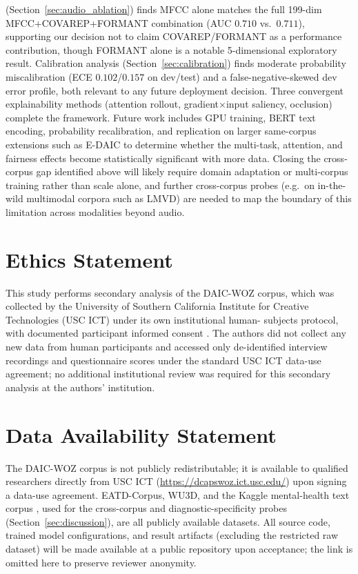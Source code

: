 \documentclass[journal]{IEEEtran}
\begin{document}
(Section~\ref{sec:audio_ablation}) finds MFCC alone matches the full
199-dim MFCC+COVAREP+FORMANT combination (AUC $0.710$ vs.\ $0.711$),
supporting our decision not to claim COVAREP/FORMANT as a performance
contribution, though FORMANT alone is a notable 5-dimensional
exploratory result. Calibration analysis
(Section~\ref{sec:calibration}) finds moderate probability
miscalibration (ECE $0.102$/$0.157$ on dev/test) and a
false-negative-skewed dev error profile, both relevant to any future
deployment decision. Three convergent explainability methods
(attention rollout, gradient$\times$input saliency, occlusion)
complete the framework. Future work includes GPU training, BERT text
encoding, probability recalibration, and replication on larger
same-corpus extensions such as E-DAIC to determine whether the
multi-task, attention, and fairness effects become statistically
significant with more data. Closing the cross-corpus gap identified
above will likely require domain adaptation or multi-corpus training
rather than scale alone, and further cross-corpus probes (e.g.\ on
in-the-wild multimodal corpora such as LMVD) are needed to map the
boundary of this limitation across modalities beyond audio.

\section*{Ethics Statement}
This study performs secondary analysis of the DAIC-WOZ corpus, which
was collected by the University of Southern California Institute for
Creative Technologies (USC ICT) under its own institutional human-
subjects protocol, with documented participant informed consent
\cite{gratch2014}. The authors did not collect any new data from human
participants and accessed only de-identified interview recordings and
questionnaire scores under the standard USC ICT data-use agreement;
no additional institutional review was required for this secondary
analysis at the authors' institution.

\section*{Data Availability Statement}
The DAIC-WOZ corpus is not publicly redistributable; it is available
to qualified researchers directly from USC ICT
(\url{https://dcapswoz.ict.usc.edu/}) upon signing a data-use
agreement. EATD-Corpus, WU3D, and the Kaggle mental-health text corpus
\cite{sarkar2022mentalhealth}, used for the cross-corpus and
diagnostic-specificity probes (Section~\ref{sec:discussion}), are all
publicly available datasets. All source code, trained model
configurations, and result artifacts (excluding the restricted raw
dataset) will be made available at a public repository upon
acceptance; the link is omitted here to preserve reviewer anonymity.
\end{document}
